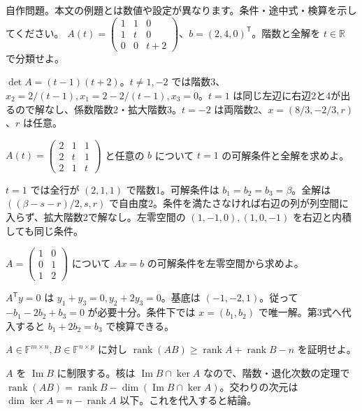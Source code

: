 \documentclass[11pt]{article}
\begin{document}
自作問題。本文の例題とは数値や設定が異なります。条件・途中式・検算を示してください。
\problem[2つの例外値]
$A(t)=\begin{pmatrix}1&1&0\\1&t&0\\0&0&t+2\end{pmatrix}$、$b=(2,4,0)^{\mathsf T}$。階数と全解を $t\in\mathbb R$ で分類せよ。
\begin{ans}
$\det A=(t-1)(t+2)$。$t\ne1,-2$ では階数3、$x_2=2/(t-1),x_1=2-2/(t-1),x_3=0$。$t=1$ は同じ左辺に右辺2と4が出るので解なし、係数階数2・拡大階数3。$t=-2$ は両階数2、$x=(8/3,-2/3,r)$、$r$ は任意。
\end{ans}
\problem[階数1への落下]
$A(t)=\begin{pmatrix}2&1&1\\2&t&1\\2&1&t\end{pmatrix}$ と任意の $b$ について $t=1$ の可解条件と全解を求めよ。
\begin{ans}
$t=1$ では全行が $(2,1,1)$ で階数1。可解条件は $b_1=b_2=b_3=\beta$。全解は $((\beta-s-r)/2,s,r)$ で自由度2。条件を満たさなければ右辺の列が列空間に入らず、拡大階数2で解なし。左零空間の $(1,-1,0),(1,0,-1)$ を右辺と内積しても同じ条件。
\end{ans}
\newpage
\problem[左零空間]
$A=\begin{pmatrix}1&0\\0&1\\1&2\end{pmatrix}$ について $Ax=b$ の可解条件を左零空間から求めよ。
\begin{ans}
$A^{\mathsf T}y=0$ は $y_1+y_3=0,y_2+2y_3=0$。基底は $(-1,-2,1)$。従って $-b_1-2b_2+b_3=0$ が必要十分。条件下では $x=(b_1,b_2)$ で唯一解。第3式へ代入すると $b_1+2b_2=b_3$ で検算できる。
\end{ans}
\problem[積の階数下限]
$A\in\mathbb F^{m\times n},B\in\mathbb F^{n\times p}$ に対し $\operatorname{rank}(AB)\ge\operatorname{rank}A+\operatorname{rank}B-n$ を証明せよ。
\begin{ans}
$A$ を $\operatorname{Im}B$ に制限する。核は $\operatorname{Im}B\cap\ker A$ なので、階数・退化次数の定理で $\operatorname{rank}(AB)=\operatorname{rank}B-\dim(\operatorname{Im}B\cap\ker A)$。交わりの次元は $\dim\ker A=n-\operatorname{rank}A$ 以下。これを代入すると結論。
\end{ans}
\end{document}
